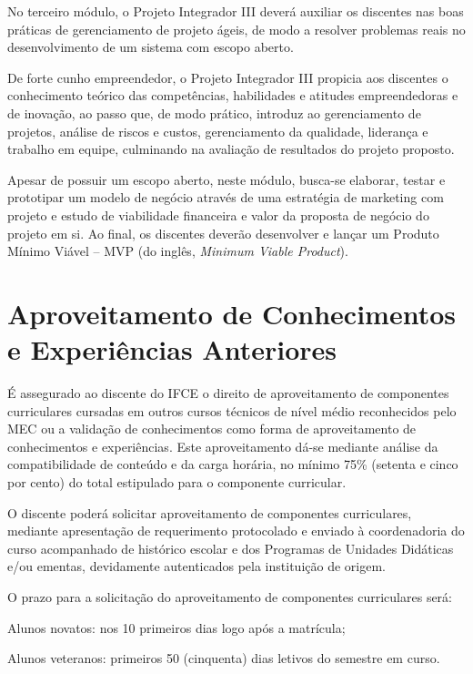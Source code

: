 \documentclass[
	12pt,				%
	openright,			%
	twoside,			%
	a4paper,			%
	chapter=TITLE,		%
	english,			%
	french,				%
	spanish,			%
	brazil,				%
	]{abntex2}
\begin{document}
\begin{alineas}
No terceiro módulo, o Projeto Integrador III deverá auxiliar os discentes nas boas práticas de gerenciamento de projeto ágeis, de modo a resolver problemas reais no desenvolvimento de um sistema com escopo aberto.

De forte cunho empreendedor, o Projeto Integrador III propicia aos discentes o conhecimento teórico das competências, habilidades e atitudes empreendedoras e de inovação, ao passo que, de modo prático, introduz ao gerenciamento de projetos, análise de riscos e custos, gerenciamento da qualidade, liderança e trabalho em equipe, culminando na avaliação de resultados do projeto proposto.

Apesar de possuir um escopo aberto, neste módulo, busca-se elaborar, testar e prototipar um modelo de negócio através de uma estratégia de marketing com projeto e estudo de viabilidade financeira e valor da proposta de negócio do projeto em si. Ao final, os discentes deverão desenvolver e lançar um Produto Mínimo Viável -- MVP (do inglês, \textit{Minimum Viable Product}).

\end{alineas}



\section{Aproveitamento de Conhecimentos e Experiências Anteriores}


É assegurado ao discente do IFCE o direito de aproveitamento de componentes curriculares cursadas em outros cursos técnicos de nível médio reconhecidos pelo MEC ou a validação de conhecimentos como forma de aproveitamento de conhecimentos e experiências. Este aproveitamento dá-se mediante análise da compatibilidade de conteúdo e da carga horária, no mínimo 75\% (setenta e cinco por cento) do total estipulado para o componente curricular.

O discente poderá solicitar aproveitamento de componentes curriculares, mediante apresentação de requerimento protocolado e enviado à coordenadoria do curso acompanhado de histórico escolar e dos Programas de Unidades Didáticas e/ou ementas, devidamente autenticados pela instituição de origem.

O prazo para a solicitação do aproveitamento de componentes curriculares será:
\begin{alineas}
\item Alunos novatos: nos 10 primeiros dias logo após a matrícula;
\item  Alunos veteranos: primeiros 50 (cinquenta) dias letivos do semestre em curso.
\end{alineas} 
\end{document}
